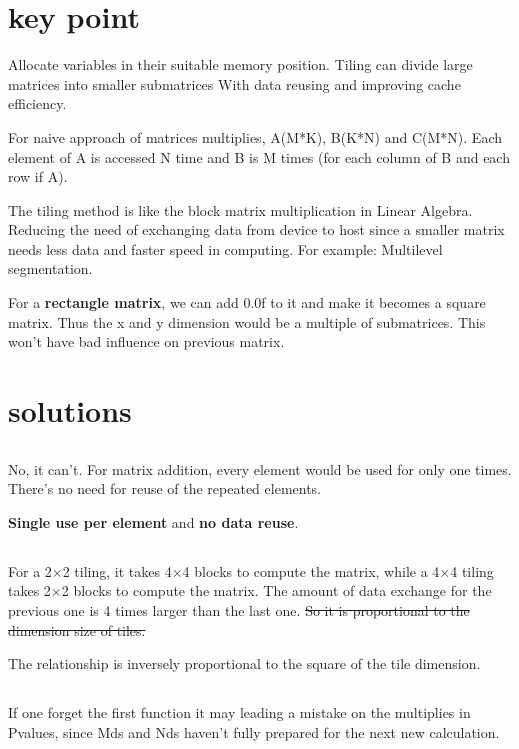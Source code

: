 \documentclass{article}
\begin{document}
\section*{key point}
Allocate variables in their suitable memory position.
Tiling can divide large matrices into smaller submatrices With data reusing and improving cache efficiency.

For naive approach of matrices multiplies, A(M*K), B(K*N) and C(M*N).
Each element of A is accessed N time and B is M times (for each column of B and each row if A).

The tiling method is like the block matrix multiplication in Linear Algebra. Reducing the need of exchanging data from device to host since a smaller matrix needs less data and faster speed in computing. For example: Multilevel segmentation.

For a \textbf{rectangle matrix}, we can add 0.0f to it and make it becomes a square matrix. Thus the x and y dimension would be a multiple of submatrices. This won't have bad influence on previous matrix.

\section{solutions}
\subsection{}
No, it can't. For matrix addition, every element would be used for only one times. There's no need for reuse of the repeated elements.

\textbf{Single use per element} and \textbf{no data reuse}.

\subsection{}
For a 2$\times$2 tiling, it takes 4$\times$4 blocks to compute the matrix, while a 4$\times$4 tiling takes 2$\times$2 blocks to compute the matrix. The amount of data exchange for the previous one is 4 times larger than the last one. \sout{So it is proportional to the dimension size of tiles.}

The relationship is inversely proportional to the square of the tile dimension.

\subsection{}
If one forget the first function it may leading a mistake on the multiplies in Pvalues, since Mds and Nds haven't fully prepared for the next new calculation.
\end{document}

